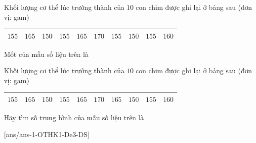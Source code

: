 \begin{ex}%
	Khối lượng cơ thể lúc trưởng thành của $10$ con chim được ghi lại ở bảng sau (đơn vị: gam)
	\begin{center}
		\begin{tabular}{*{10}{|>{\centering\arraybackslash}p{0.8cm}}|}
			\hline
			$155$ & $165$ & $150$ & $155$ & $165$ & $170$ & $155$ & $150$ & $155$ & $160$\\
			\hline
		\end{tabular}
	\end{center}
Mốt của mẫu số liệu trên là
\end{ex}
\begin{ex}%
	Khối lượng cơ thể lúc trưởng thành của $10$ con chim được ghi lại ở bảng sau (đơn vị: gam)
	\begin{center}
		\begin{tabular}{*{10}{|>{\centering\arraybackslash}p{0.8cm}}|}
			\hline
			$155$ & $165$ & $150$ & $155$ & $165$ & $170$ & $165$ & $150$ & $155$ & $160$\\
			\hline
		\end{tabular}
	\end{center}
	Hãy tìm số trung bình của mẫu số liệu trên là
\end{ex}
[ans/ans-1-OTHK1-De3-DS]
\cauds
